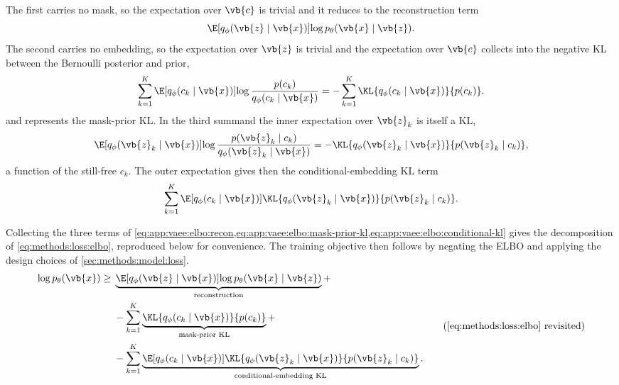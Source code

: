 The first carries no mask, so the expectation over $\vb{c}$ is trivial and it
reduces to the reconstruction term
\begin{equation} \label{eq:app:vaee:elbo:recon}
    \E[q_\phi(\vb{z} \mid \vb{x})]{\log p_\theta(\vb{x} \mid \vb{z})}.
\end{equation}
The second carries no embedding, so the expectation over $\vb{z}$ is trivial and
the expectation over $\vb{c}$ collects into the negative \ac{KL} between the
Bernoulli posterior and prior,
\begin{equation} \label{eq:app:vaee:elbo:mask-prior-kl}
    \sum_{k=1}^{K} \E[q_\phi(c_k \mid \vb{x})]{\log \frac{p(c_k)}{q_\phi(c_k \mid \vb{x})}} =
    - \sum_{k=1}^{K} \KL{q_\phi(c_k \mid \vb{x})}{p(c_k)}.
\end{equation}
and represents the mask-prior \ac{KL}.
In the third summand the inner expectation over $\vb{z}_k$ is itself a \ac{KL},
\begin{equation*}
    \E[q_\phi(\vb{z}_k \mid \vb{x})]{\log \frac{p(\vb{z}_k \mid c_k)}{q_\phi(\vb{z}_k \mid \vb{x})}}
    = -\KL{q_\phi(\vb{z}_k \mid \vb{x})}{p(\vb{z}_k \mid c_k)},
\end{equation*}
a function of the still-free $c_k$. The outer expectation gives then the
conditional-embedding \ac{KL} term
\begin{equation} \label{eq:app:vaee:elbo:conditional-kl}
    \sum_{k=1}^{K} \E[q_\phi(c_k \mid \vb{x})]{\KL{q_\phi(\vb{z}_k \mid \vb{x})}{p(\vb{z}_k \mid c_k)}}.
\end{equation}

Collecting the three terms of
\cref{eq:app:vaee:elbo:recon,eq:app:vaee:elbo:mask-prior-kl,eq:app:vaee:elbo:conditional-kl}
gives the decomposition of
\cref{eq:methods:loss:elbo}, reproduced below for convenience.
The training objective then follows by negating the \ac{ELBO} and applying the
design choices of
\cref{sec:methods:model:loss}.
\begin{equation*}
    \begin{split}
        \log p_{\theta}(\vb{x}) \ge
        {}& \underbrace{\E[q_{\phi}(\vb{z} \mid \vb{x})]{\log p_{\theta}(\vb{x} \mid \vb{z})}}_{\text{reconstruction}} +\\
        &- \sum_{k=1}^{K} \underbrace{\KL{q_{\phi}(c_{k} \mid \vb{x})}{p(c_{k})}}_{\text{mask-prior KL}} +\\
        &- \sum_{k=1}^{K} \underbrace{\E[q_{\phi}(c_{k} \mid \vb{x})]{\KL{q_{\phi}(\vb{z}_{k} \mid \vb{x})}{p(\vb{z}_{k} \mid c_{k})}}}_{\text{conditional-embedding KL}}.
    \end{split} \tag{\ref{eq:methods:loss:elbo} revisited}
\end{equation*}


